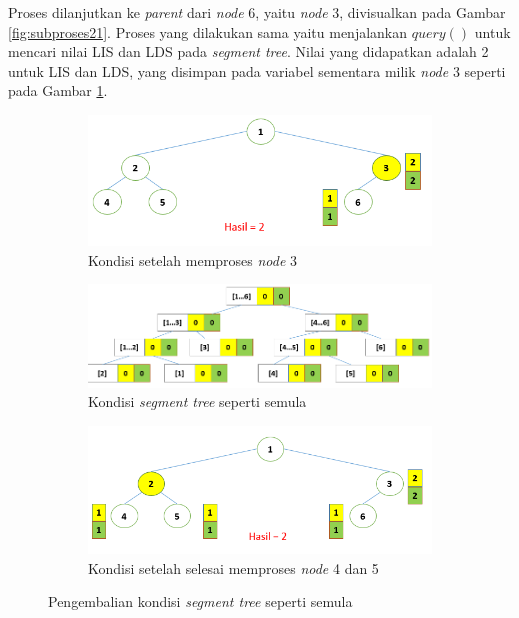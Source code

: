 \quad Proses dilanjutkan ke \textit{parent} dari \textit{node} 6, yaitu \textit{node} 3, divisualkan pada Gambar \ref{fig:subproses21}. Proses yang dilakukan sama yaitu menjalankan \textit{$query()$} untuk mencari nilai LIS dan LDS pada \textit{segment tree}. Nilai yang didapatkan adalah 2 untuk LIS dan LDS, yang disimpan pada variabel sementara milik \textit{node} 3 seperti pada Gambar \ref{fig:subproses22}.
\begin{figure}[H]
	\begin{subfigure}{1.0\textwidth}
		\centering
		\includegraphics[scale=0.33]{assets/images/Ilustrasi_proses_22.PNG}
		\caption{Kondisi setelah memproses \textit{node} 3}
		\label{fig:subproses22}
	\end{subfigure}
	\begin{subfigure}{1.0\textwidth}
		\centering
		\includegraphics[scale=0.33]{assets/images/Ilustrasi_proses_23.PNG}
		\caption{Kondisi \textit{segment tree} seperti semula}
		\label{fig:subproses23}
	\end{subfigure}
	\begin{subfigure}{1.0\textwidth}
		\centering
		\includegraphics[scale=0.33]{assets/images/Ilustrasi_proses_24.PNG}
		\caption{Kondisi setelah selesai memproses \textit{node} 4 dan 5}
		\label{fig:subproses24}
	\end{subfigure}
	\caption{Pengembalian kondisi \textit{segment tree} seperti semula}
	\label{fig:proses6}
\end{figure}

